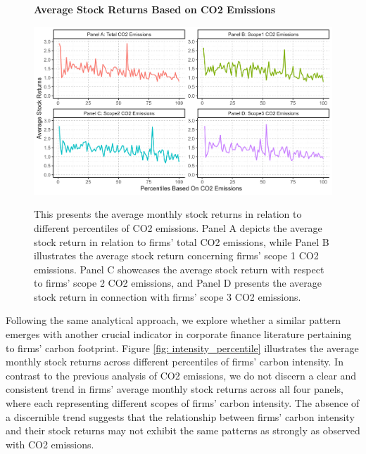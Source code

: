 \documentclass[12pt]{article}
\begin{document}
\begin{figure}[!ht]
\centering
\caption{\textbf{Average Stock Returns Based on CO2 Emissions}}
\includegraphics{image/co2_percentile.png}
\label{fig: co2_percentile}
\caption*{\footnotesize{This presents the average monthly stock returns in relation to different percentiles of CO2 emissions. Panel A depicts the average stock return in relation to firms' total CO2 emissions, while Panel B illustrates the average stock return concerning firms' scope 1 CO2 emissions. Panel C showcases the average stock return with respect to firms' scope 2 CO2 emissions, and Panel D presents the average stock return in connection with firms' scope 3 CO2 emissions.}}
\end{figure}

Following the same analytical approach, we explore whether a similar pattern emerges with another crucial indicator in corporate finance literature pertaining to firms' carbon footprint. Figure \ref{fig: intensity_percentile} illustrates the average monthly stock returns across different percentiles of firms' carbon intensity. In contrast to the previous analysis of CO2 emissions, we do not discern a clear and consistent trend in firms' average monthly stock returns across all four panels, where each representing different scopes of firms' carbon intensity. The absence of a discernible trend suggests that the relationship between firms' carbon intensity and their stock returns may not exhibit the same patterns as strongly as observed with CO2 emissions. 
\end{document}
